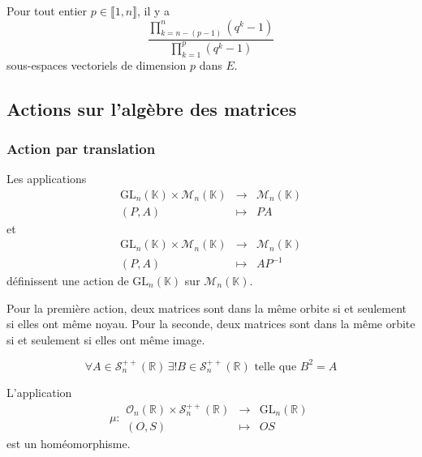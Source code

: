 	\begin{application}
		Pour tout entier $p \in \llbracket 1, n \rrbracket$, il y a
		\[ \frac{\prod_{k=n-(p-1)}^{n} (q^k - 1)}{\prod_{k=1}^{p} (q^k - 1)} \]
		sous-espaces vectoriels de dimension $p$ dans $E$.
	\end{application}

	\subsection{Actions sur l'algèbre des matrices}

	\subsubsection{Action par translation}


	\begin{proposition}
		Les applications
		\[
		\begin{array}{ccc}
			\mathrm{GL}_n(\mathbb{K}) \times \mathcal{M}_n(\mathbb{K}) &\rightarrow& \mathcal{M}_n(\mathbb{K}) \\
			(P, A) &\mapsto& PA
		\end{array}
		\]
		et
		\[
		\begin{array}{ccc}
			\mathrm{GL}_n(\mathbb{K}) \times \mathcal{M}_n(\mathbb{K}) &\rightarrow& \mathcal{M}_n(\mathbb{K}) \\
			(P, A) &\mapsto& AP^{-1}
		\end{array}
		\]
		définissent une action de $\mathrm{GL}_n(\mathbb{K})$ sur $\mathcal{M}_n(\mathbb{K})$.
	\end{proposition}

	\begin{remark}
		Pour la première action, deux matrices sont dans la même orbite si et seulement si elles ont même noyau. Pour la seconde, deux matrices sont dans la même orbite si et seulement si elles ont même image.
	\end{remark}


	\begin{lemma}
		\[ \forall A \in \mathcal{S}_n^{++}(\mathbb{R}) \, \exists! B \in \mathcal{S}_n^{++}(\mathbb{R}) \text{ telle que } B^2 = A \]
	\end{lemma}


	\begin{theorem}
		L'application
		\[ \mu :
		\begin{array}{ccc}
			\mathcal{O}_n(\mathbb{R}) \times \mathcal{S}_n^{++}(\mathbb{R}) &\rightarrow& \mathrm{GL}_n(\mathbb{R}) \\
			(O, S) &\mapsto& OS
		\end{array}
		\]
		est un homéomorphisme.
	\end{theorem}

